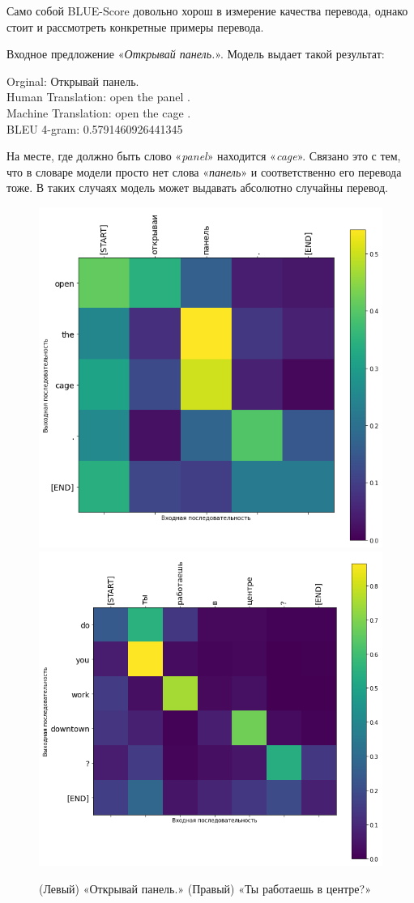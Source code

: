 \documentclass[a4paper,12pt]{article}
\begin{document}
	Само собой BLUE-Score довольно хорош в измерение качества перевода, однако стоит и рассмотреть конкретные примеры перевода.
	
	Входное предложение «\textit{Открывай панель.}». Модель выдает такой результат:
	\begin{table}[h]
	\footnotesize {
        {Orginal}: Открывай панель. \\
        {Human Translation}: open the panel . \\
        {Machine Translation}: open the cage . \\
        {BLEU 4-gram}: 0.5791460926441345
    }
	\end{table}
	
	На месте, где должно быть слово «\textit{panel}» находится «\textit{cage}». Связано это с тем, что в словаре модели просто нет слова «\textit{панель}» и соответственно его перевода тоже. В таких случаях модель может выдавать абсолютно случайны перевод. 
	
	\begin{figure}[ht!]
        \includegraphics[width=.5\textwidth]{img/RUS-ENG-1.png}\hfill
        \includegraphics[width=.5\textwidth]{img/RUS-ENG-2.png}\hfill
        \caption{(Левый) «Открывай панель.» (Правый) «Ты работаешь в центре?»}
    \end{figure}
	
\end{document}
